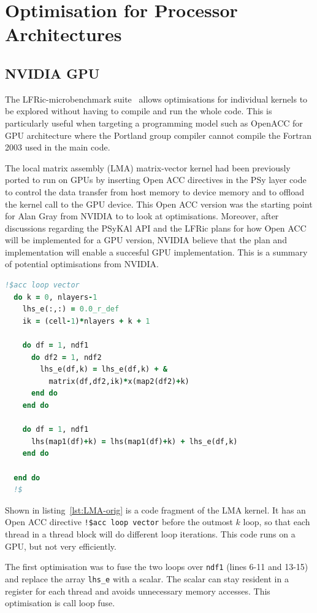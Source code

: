 \section{Optimisation for Processor Architectures
\label{sec:pa}}

\subsection{NVIDIA GPU}
The LFRic-microbenchmark suite~\cite{lfric-microbenchmarks} allows
optimisations for individual kernels to be explored without having to
compile and run the whole code. This is particularly useful when
targeting a programming model such as OpenACC for GPU architecture
where the Portland group compiler cannot compile the Fortran 2003 used 
in the main code.

The local matrix assembly (LMA) matrix-vector kernel had been
previously ported to run on GPUs by inserting Open ACC directives in
the PSy layer code to control the data transfer from host memory to
device memory and to offload the kernel call to the GPU device. This
Open ACC version was the starting point for Alan Gray from NVIDIA to
to look at optimisations. Moreover, after discussions regarding 
the PSyKAl API and the LFRic plans for how Open ACC will be
implemented for a GPU version, NVIDIA believe that the plan and
implementation will enable a succesful GPU implementation.
This is a summary of potential optimisations from NVIDIA.

\begin{lstlisting}[language=Fortran,caption={Code fragment of original 
    kernel},label={lst:LMA-orig}]
  !$acc loop vector 
  do k = 0, nlayers-1
    lhs_e(:,:) = 0.0_r_def
    ik = (cell-1)*nlayers + k + 1

    do df = 1, ndf1
      do df2 = 1, ndf2
        lhs_e(df,k) = lhs_e(df,k) + & 
          matrix(df,df2,ik)*x(map2(df2)+k)
      end do
    end do

    do df = 1, ndf1
      lhs(map1(df)+k) = lhs(map1(df)+k) + lhs_e(df,k)
    end do

  end do 
  !$
\end{lstlisting}

Shown in listing~\ref{lst:LMA-orig} is a code fragment of the LMA
kernel. It has an Open ACC directive \verb+!$acc loop vector+ before the
outmost $k$ loop, so that each thread in a thread block will do different loop
iterations. This code runs on a GPU, but not very efficiently. 

The first optimisation was to fuse the two loops over \verb+ndf1+
(lines 6-11 and 13-15) and replace the array \verb+lhs_e+ with a
scalar. The scalar can stay resident in a register for each thread and
avoids unnecessary memory accesses. This optimisation is call loop
fuse. 

